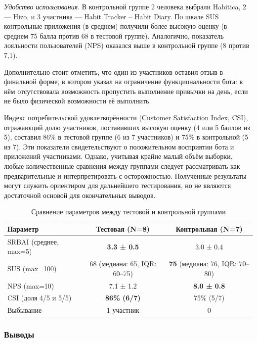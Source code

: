 \documentclass[pdflatex,sn-mathphys-num]{sn-jnl}%
\theoremstyle{thmstyleone}%
\theoremstyle{thmstyletwo}%
\theoremstyle{thmstylethree}%
\begin{document}
\textit{Удобство использования}. В контрольной группе 2 человека выбрали Habitica, 2 — Hizo, и 3 участника — Habit Tracker – Habit Diary. По шкале SUS контрольные приложения (в среднем) получили более высокую оценку (в среднем 75 балла против 68 в тестовой группе). Аналогично, показатель лояльности пользователей (NPS) оказался выше в контрольной группе (8 против 7,1). 

Дополнительно стоит отметить, что один из участников оставил отзыв в финальной форме, в котором указал на ограничение функциональности бота: в нём отсутствовала возможность пропустить выполнение привычки на день, если не было физической возможности её выполнить. 

Индекс потребительской удовлетворённости (Customer Satisfaction Index, CSI), отражающий долю участников, поставивших высокую оценку (4 или 5 баллов из 5), составил 86\% в тестовой группе (6 из 7 участников) и 75\% в контрольной (5 из 7). Эти показатели свидетельствуют о положительном восприятии бота и приложений участниками. Однако, учитывая крайне малый объём выборки, любые количественные сравнения между группами следует рассматривать как предварительные и интерпретировать с осторожностью. Полученные результаты могут служить ориентиром для дальнейшего тестирования, но не являются достаточной основой для окончательных выводов.

\begin{table}[h!]
\centering
\normalsize
\caption{Сравнение параметров между тестовой и контрольной группами}
\begin{tabular}{|l|c|c|}
\hline
\textbf{Параметр} & \textbf{Тестовая (N=8)} & \textbf{Контрольная (N=7)} \\
\hline
SRBAI (среднее, max=5) & \textbf{3.3 ± 0.5} & 3.0 ± 0.4 \\
\hline
SUS (max=100) & 68 (медиана: 65, IQR: 60–75) & \textbf{75} (медиана: 76, IQR: 70–80) \\
\hline
NPS (max=10) & 7.1 ± 1.2 & \textbf{8.0 ± 0.8} \\
\hline
CSI (доля 4/5 и 5/5) & \textbf{86\% (6/7)} & 75\% (5/7) \\
\hline
Выбывание & 1 участник & 0 \\
\hline
\end{tabular}
\end{table}

\subsubsection{Выводы}
\end{document}
